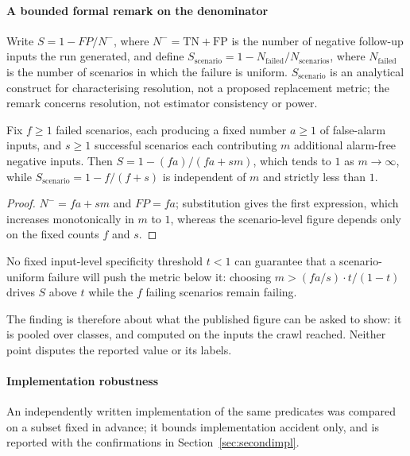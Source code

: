\paragraph{A bounded formal remark on the denominator}
Write $S=1-\mathit{FP}/N^{-}$, where $N^{-}=\mathrm{TN}+\mathrm{FP}$ is the number of
negative follow-up inputs the run generated, and define $S_{\mathrm{scenario}} = 1 -
N_{\mathrm{failed}} / N_{\mathrm{scenarios}}$, where $N_{\mathrm{failed}}$ is the
number of scenarios in which the failure is uniform. $S_{\mathrm{scenario}}$ is an
analytical construct for characterising resolution, not a proposed replacement
metric; the remark concerns resolution, not estimator consistency or power.

\begin{proposition}
\label{prop:resolution}
Fix $f \ge 1$ failed scenarios, each producing a fixed number $a \ge 1$ of
false-alarm inputs, and $s \ge 1$ successful scenarios each contributing $m$
additional alarm-free negative inputs. Then
$S = 1 - (f a) / (f a + s m)$, which tends to $1$ as $m \to \infty$, while
$S_{\mathrm{scenario}} = 1 - f/(f+s)$ is independent of $m$ and strictly less
than $1$.
\end{proposition}

\begin{proof}
$N^{-} = f a + s m$ and $\mathit{FP} = f a$; substitution gives the first
expression, which increases monotonically in $m$ to $1$, whereas the
scenario-level figure depends only on the fixed counts $f$ and $s$.
\end{proof}

\begin{corollary}
\label{cor:resolution}
No fixed input-level specificity threshold $t < 1$ can guarantee that a
scenario-uniform failure will push the metric below it: choosing
$m > (f a/s)\cdot t/(1-t)$ drives $S$ above $t$ while the $f$ failing
scenarios remain failing.
\end{corollary}

The finding is therefore about what the published figure can be asked to show: it is
pooled over classes, and computed on the inputs the crawl reached. Neither point
disputes the reported value or its labels.

\paragraph{Implementation robustness}
An independently written implementation of the same predicates was compared on a
subset fixed in advance; it bounds implementation accident only, and is reported with
the confirmations in Section~\ref{sec:secondimpl}.
